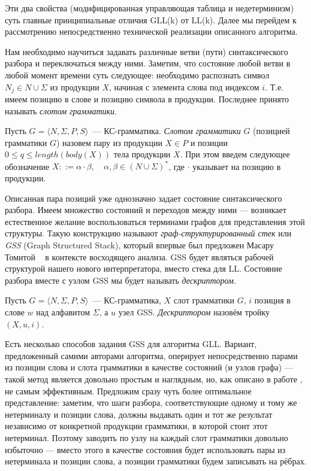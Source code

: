 Эти два свойства (модифицированная управляющая таблица и недетерминизм) суть главные принципиальные отличия GLL(k) от LL(k). Далее мы перейдем к рассмотрению непосредственно технической реализации описанного алгоритма.

Нам необходимо научиться задавать различные ветви (пути) синтаксического разбора и переключаться между ними. Заметим, что состояние любой ветви в любой момент времени суть следующее: необходимо распознать символ $N_j \in N \cup \Sigma$ из продукции $X$, начиная с элемента слова под индексом $i$. Т.е. имеем позицию в слове и позицию символа в продукции. Последнее принято называть \textit{слотом грамматики}. 

\begin{definition}
  Пусть $G = \langle N, \Sigma, P, S \rangle$~--- КС-грамматика. \textit{Слотом грамматики} $G$ (позицией грамматики $G$) назовем пару из продукции $X \in P$ и позиции $0 \leq q \leq length(body(X))$ тела продукции $X$. При этом введем следующее обозначение $X ::= \alpha \cdot \beta, \quad \alpha,\beta \in (N \cup \Sigma)^*$, где $ \cdot $ указывает на позицию в продукции.
\end{definition}

Описанная пара позиций уже однозначно задает состояние синтаксического разбора. Имеем множество состояний и переходов между ними --- возникает естественное желание воспользоваться терминами графов для представления этой структуры. Такую конструкцию называют \textit{граф-структурированный стек} или \textit{GSS} (Graph Structured Stack), который впервые был предложен Масару Томитой ~\cite{tomita1988graph} в контексте восходящего анализа. GSS будет являться рабочей структурой нашего нового интерпретатора, вместо стека для LL. Состояние разбора вместе с узлом GSS мы будет называть \textit{дескриптором}.

\begin{definition} 
	Пусть $G = \langle N, \Sigma, P, S \rangle$~--- КС-грамматика, $X$ слот грамматики $G$, $i$ позиция в слове $ w $ над алфавитом $\Sigma$, а $ u $ узел GSS. \textit{Дескриптором} назовём тройку $ (X, u, i) $.
\end{definition}

Есть несколько способов задания GSS для алгоритма GLL. Вариант, предложенный самими авторами алгоритма, оперирует непосредственно парами из позиции слова и слота грамматики в качестве состояний (и узлов графа) --- такой метод является довольно простым и наглядным, но, как описано в работе \cite{10.1007/978-3-662-46663-6_5}, не самым эффективным. Предложим сразу чуть более оптимальное представление: заметим, что шаги разбора, соответствующие одному и тому же нетерминалу и позиции слова, должны выдавать один и тот же результат независимо от конкретной продукции грамматики, в которой стоит этот нетерминал. Поэтому заводить по узлу на каждый слот грамматики довольно избыточно --- вместо этого в качестве состояния будет использовать пары из нетерминала и позиции слова, а позиции грамматики будем записывать на рёбрах.  

